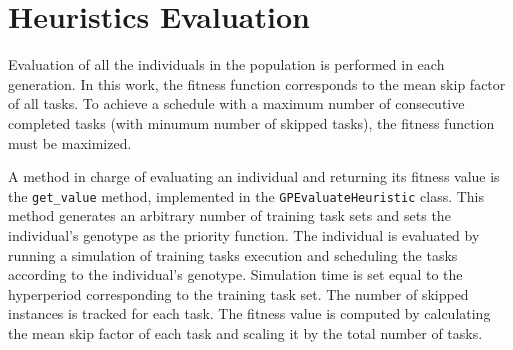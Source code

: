\section{Heuristics Evaluation}
\label{evaluation}
Evaluation of all the individuals in the population is performed in each generation.
In this work, the fitness function corresponds to the mean skip factor of all tasks.
To achieve a schedule with a maximum number of consecutive completed tasks (with minumum number of skipped tasks), the fitness function must be maximized.

A method in charge of evaluating an individual and returning its fitness value is the \texttt{get\_value} method, implemented in the \texttt{GPEvaluateHeuristic} class.
This method generates an arbitrary number of training task sets and sets the individual's genotype as the priority function.
The individual is evaluated by running a simulation of training tasks execution and scheduling the tasks according to the individual's genotype.
Simulation time is set equal to the hyperperiod corresponding to the training task set.
The number of skipped instances is tracked for each task.
The fitness value is computed by calculating the mean skip factor of each task and scaling it by the total number of tasks.

